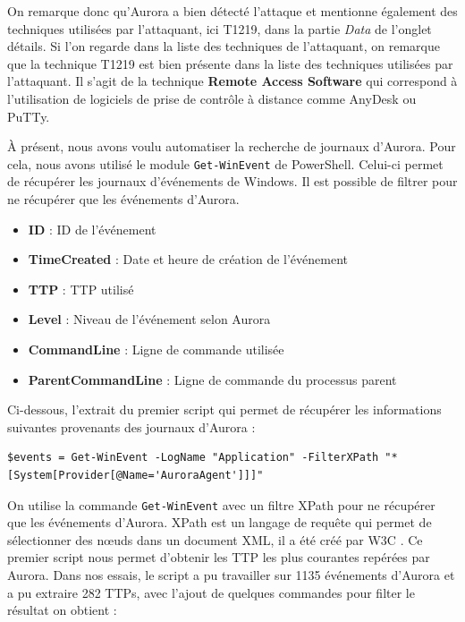 \documentclass[12pt,letterpaper]{article}
\begin{document}
\bigskip

On remarque donc qu'Aurora a bien détecté l'attaque et mentionne également des techniques utilisées par l'attaquant, ici T1219, dans la partie \textit{Data} de l'onglet détails.
Si l'on regarde dans la liste des techniques de l'attaquant, on remarque que la technique T1219 est bien présente dans la liste des techniques utilisées par l'attaquant.
Il s'agit de la technique \textbf{Remote Access Software} qui correspond à l'utilisation de logiciels de prise de contrôle à distance comme AnyDesk ou PuTTy.

\newpage

À présent, nous avons voulu automatiser la recherche de journaux d'Aurora.
Pour cela, nous avons utilisé le module \verb|Get-WinEvent| de PowerShell.
Celui-ci permet de récupérer les journaux d'événements de Windows.
Il est possible de filtrer pour ne récupérer que les événements d'Aurora.
\begin{itemize}
    \item \textbf{ID} : ID de l'événement
    \item \textbf{TimeCreated} : Date et heure de création de l'événement
    \item \textbf{TTP} : TTP utilisé
    \item \textbf{Level} : Niveau de l'événement selon Aurora
    \item \textbf{CommandLine} : Ligne de commande utilisée
    \item \textbf{ParentCommandLine} : Ligne de commande du processus parent
\end{itemize}

Ci-dessous, l'extrait du premier script qui permet de récupérer les informations suivantes provenants des journaux d'Aurora :

\begin{lstlisting}[caption={Récupération des journaux d'Aurora}, label={lst:aurora_logs}]
$events = Get-WinEvent -LogName "Application" -FilterXPath "*[System[Provider[@Name='AuroraAgent']]]"
\end{lstlisting}

On utilise la commande \verb|Get-WinEvent| avec un filtre XPath pour ne récupérer que les événements d'Aurora.
XPath est un langage de requête qui permet de sélectionner des nœuds dans un document XML, il a été créé par W3C \cite{XMLPathLanguage}.
Ce premier script nous permet d'obtenir les TTP les plus courantes repérées par Aurora.
Dans nos essais, le script a pu travailler sur 1135 événements d'Aurora et a pu extraire 282 TTPs, avec l'ajout de quelques commandes pour filter le résultat on obtient :
\end{document}
